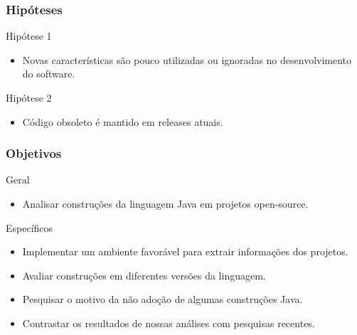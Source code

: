 \documentclass[]{beamer}
\begin{document}
	
	\begin{frame}[fragile]\frametitle{Hipóteses}
		
		\begin{block}{Hipótese 1}
			\begin{itemize}
				\item Novas características são pouco utilizadas ou ignoradas no desenvolvimento do software.
			\end{itemize}
		
		\end{block}
		
		\begin{block}{Hipótese 2}
			\begin{itemize}
				\item Código obsoleto é mantido em releases atuais.
			\end{itemize}
		\end{block}

		
	\end{frame}
	
	
	\begin{frame}[fragile]\frametitle{Objetivos}
		\begin{block}{Geral}
			\begin{itemize}
				\item Analisar construções da linguagem Java em projetos open-source.
			\end{itemize}
		\end{block}
			
			\begin{block}{Específicos}
				\begin{itemize}
					\item Implementar um ambiente favorável para extrair informações dos projetos.
					\item Avaliar construções em diferentes versões da linguagem.
					\item Pesquisar o motivo da não adoção de algumas construções Java.
					\item Contrastar os resultados de nossas análises com pesquisas recentes.
				\end{itemize}
			\end{block}
	\end{frame}
	
\end{document}

